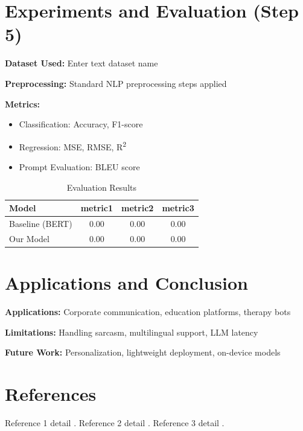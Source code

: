 \documentclass{ecai}
\begin{document}
\section{Experiments and Evaluation (Step 5)}
\textbf{Dataset Used:} Enter text dataset name

\textbf{Preprocessing:} Standard NLP preprocessing steps applied

\textbf{Metrics:}
\begin{itemize}
  \item Classification: Accuracy, F1-score
  \item Regression: MSE, RMSE, R\textsuperscript{2}
  \item Prompt Evaluation: BLEU score
\end{itemize}

\begin{table}[h]
  \centering
  \begin{tabular}{@{}lccc@{}}
    \toprule
    Model & metric1 & metric2 & metric3 \\
    \midrule
    Baseline (BERT) & 0.00 & 0.00 & 0.00 \\
    Our Model & 0.00 & 0.00 & 0.00 \\
    \bottomrule
  \end{tabular}
  \caption{Evaluation Results}
\end{table}

\section{Applications and Conclusion}
\textbf{Applications:} Corporate communication, education platforms, therapy bots

\textbf{Limitations:} Handling sarcasm, multilingual support, LLM latency

\textbf{Future Work:} Personalization, lightweight deployment, on-device models

\clearpage
\section*{References}
\begin{thebibliography}{9}
 Reference 1 detail \emph{  }.
 Reference 2 detail \emph{  }.
 Reference 3 detail \emph{  }.
\end{thebibliography}
\end{document}
